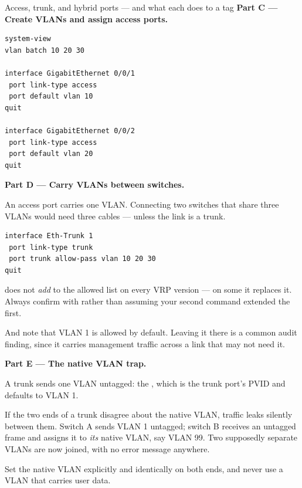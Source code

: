 \begin{labproject}{Access, trunk, and hybrid ports --- and what each does to a tag}
\medskip\noindent\textbf{Part C --- Create VLANs and assign access ports.}\par

\begin{lstlisting}[style=utpterminal]
system-view
vlan batch 10 20 30

interface GigabitEthernet 0/0/1
 port link-type access
 port default vlan 10
quit

interface GigabitEthernet 0/0/2
 port link-type access
 port default vlan 20
quit
\end{lstlisting}

\medskip\noindent\textbf{Part D --- Carry VLANs between switches.}\par
An access port carries one VLAN. Connecting two switches that share three VLANs would need three cables --- unless the link is a trunk.

\begin{lstlisting}[style=utpterminal]
interface Eth-Trunk 1
 port link-type trunk
 port trunk allow-pass vlan 10 20 30
quit
\end{lstlisting}

\begin{pitfall}
 does not \emph{add} to the allowed list on every VRP version --- on some it replaces it. Always confirm with  rather than assuming your second command extended the first.

And note that VLAN 1 is allowed by default. Leaving it there is a common audit finding, since it carries management traffic across a link that may not need it.
\end{pitfall}

\medskip\noindent\textbf{Part E --- The native VLAN trap.}\par

\begin{keyidea}
A trunk sends one VLAN untagged: the , which is the trunk port's PVID and defaults to VLAN 1.

If the two ends of a trunk disagree about the native VLAN, traffic leaks silently between them. Switch A sends VLAN 1 untagged; switch B receives an untagged frame and assigns it to \emph{its} native VLAN, say VLAN 99. Two supposedly separate VLANs are now joined, with no error message anywhere.

Set the native VLAN explicitly and identically on both ends, and never use a VLAN that carries user data.
\end{keyidea}


\end{labproject}
